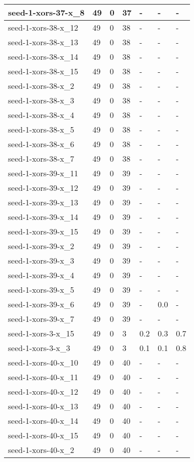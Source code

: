 \begin{scriptsize}
\begin{longtable}{|p{5cm}|l|l|l|l|l|l|}
seed-1-xors-37-x\_8&49&0&37&-&-&- \\ \hline 
seed-1-xors-38-x\_12&49&0&38&-&-&- \\ \hline 
seed-1-xors-38-x\_13&49&0&38&-&-&- \\ \hline 
seed-1-xors-38-x\_14&49&0&38&-&-&- \\ \hline 
seed-1-xors-38-x\_15&49&0&38&-&-&- \\ \hline 
seed-1-xors-38-x\_2&49&0&38&-&-&- \\ \hline 
seed-1-xors-38-x\_3&49&0&38&-&-&- \\ \hline 
seed-1-xors-38-x\_4&49&0&38&-&-&- \\ \hline 
seed-1-xors-38-x\_5&49&0&38&-&-&- \\ \hline 
seed-1-xors-38-x\_6&49&0&38&-&-&- \\ \hline 
seed-1-xors-38-x\_7&49&0&38&-&-&- \\ \hline 
seed-1-xors-39-x\_11&49&0&39&-&-&- \\ \hline 
seed-1-xors-39-x\_12&49&0&39&-&-&- \\ \hline 
seed-1-xors-39-x\_13&49&0&39&-&-&- \\ \hline 
seed-1-xors-39-x\_14&49&0&39&-&-&- \\ \hline 
seed-1-xors-39-x\_15&49&0&39&-&-&- \\ \hline 
seed-1-xors-39-x\_2&49&0&39&-&-&- \\ \hline 
seed-1-xors-39-x\_3&49&0&39&-&-&- \\ \hline 
seed-1-xors-39-x\_4&49&0&39&-&-&- \\ \hline 
seed-1-xors-39-x\_5&49&0&39&-&-&- \\ \hline 
seed-1-xors-39-x\_6&49&0&39&-&0.0&- \\ \hline 
seed-1-xors-39-x\_7&49&0&39&-&-&- \\ \hline 
seed-1-xors-3-x\_15&49&0&3&0.2&0.3&0.7 \\ \hline 
seed-1-xors-3-x\_3&49&0&3&0.1&0.1&0.8 \\ \hline 
seed-1-xors-40-x\_10&49&0&40&-&-&- \\ \hline 
seed-1-xors-40-x\_11&49&0&40&-&-&- \\ \hline 
seed-1-xors-40-x\_12&49&0&40&-&-&- \\ \hline 
seed-1-xors-40-x\_13&49&0&40&-&-&- \\ \hline 
seed-1-xors-40-x\_14&49&0&40&-&-&- \\ \hline 
seed-1-xors-40-x\_15&49&0&40&-&-&- \\ \hline 
seed-1-xors-40-x\_2&49&0&40&-&-&- \\ \hline 

\end{longtable}
\end{scriptsize}
